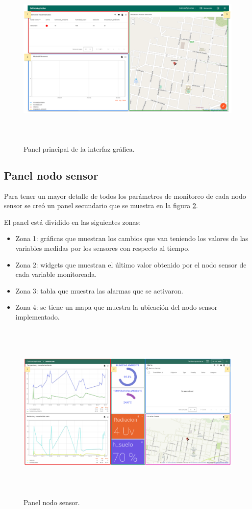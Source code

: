 \begin{figure}[h]
  \centering
	\includegraphics[width=\textwidth, height=9cm]{./Figures/panel_principal_editado.png}
  \caption{Panel principal de la interfaz gráfica.}
	\label{fig:Panel principal}
\end{figure}

\subsection{Panel nodo sensor} 

Para tener un mayor detalle de todos los parámetros de monitoreo de cada nodo sensor se creó un panel secundario que se muestra en la figura \ref{fig:Panel nodo sensor}.

El panel está dividido en las siguientes zonas:
\begin{itemize}
  \item Zona 1: gráficas que muestran los cambios que van teniendo los valores de las variables medidas por los sensores con respecto al tiempo.
  \item Zona 2: widgets que muestran el último valor obtenido por el nodo sensor de cada variable monitoreada.
  \item Zona 3: tabla que muestra las alarmas que se activaron. 
  \item Zona 4: se tiene un mapa que muestra la ubicación del nodo sensor implementado.
\end{itemize}

\begin{figure}[hbt!]
  \centering
	\includegraphics[width=\textwidth, height=9cm]{./Figures/panel_nodosensor_editado2.png}
  \caption{Panel nodo sensor.}
	\label{fig:Panel nodo sensor}
\end{figure}